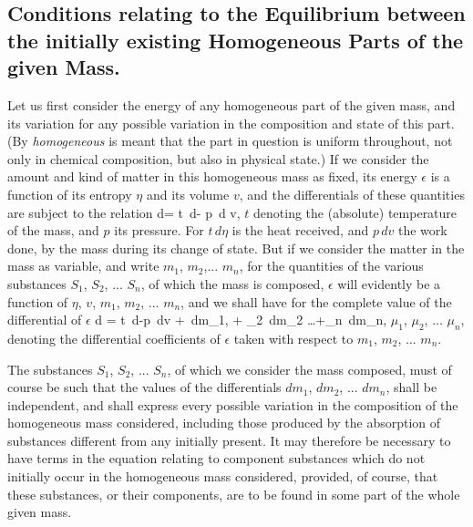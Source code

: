 \documentclass[12pt]{article}
\begin{document}
\subsection{Conditions relating to the Equilibrium between the initially existing Homogeneous Parts of the given Mass.}
Let us first consider the energy of any homogeneous part of the given mass, and its variation for any possible variation in the composition and state of this part. (By \textit{homogeneous} is meant that the part in question is uniform throughout, not only in chemical composition, but also in physical state.) If we consider the amount and kind of matter in this homogeneous mass as fixed, its energy $\epsilon$ is a function of its entropy $\eta$ and its volume $v$, and the differentials of these quantities are subject to the relation
\eqs
d\epsilon= t \,d\eta - p \,d v,   \label{11}                   
\eqe
$t$ denoting the (absolute) temperature of the mass, and $p$ its pressure. For $t\, d \eta$ is the heat received, and $p \,dv$ the work done, by the mass during its change of state. But if we consider the matter in the mass as variable, and write $m_1$, $m_2$,... $m_n$, for the quantities of the various substances $S_1$, $S_2$, ... $S_n$, of which the mass is composed, $\epsilon$ will evidently be a function of $\eta$, $v$, $m_1$, $m_2$, ... $m_n$, and we shall have for the complete value of the differential of $\epsilon$
\eqs
d \epsilon = t \,d\eta -p \,dv + \mu \,dm_1, + \mu_2 \,dm_2 \dots +\mu_n \,dm_n, \label{12}  
\eqe
$\mu_1$, $\mu_2$, ... $\mu_n$, denoting the differential coefficients of $\epsilon$ taken with respect to $m_1$, $m_2$, ... $m_n$.

The substances $S_1$, $S_2$, ... $S_n$, of which we consider the mass composed, must of course be such that the values of the differentials $dm_1$, $dm_2$, ... $dm_n$, shall be independent, and shall express every possible variation in the composition of the homogeneous mass considered, including those produced by the absorption of substances different from any initially present. It may therefore be necessary to have terms in the equation relating to component substances which do not initially occur in the homogeneous mass considered, provided, of course, that these substances, or their components, are to be found in some part of the whole given mass.
\end{document}

